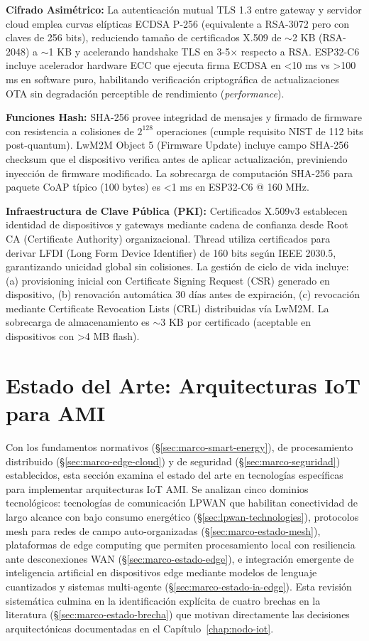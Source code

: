 \textbf{Cifrado Asimétrico:} La autenticación mutual TLS 1.3 entre gateway y servidor cloud emplea curvas elípticas ECDSA P-256 (equivalente a RSA-3072 pero con claves de 256 bits), reduciendo tamaño de certificados X.509 de $\sim$2 KB (RSA-2048) a $\sim$1 KB y acelerando handshake TLS en 3-5$\times$ respecto a RSA. ESP32-C6 incluye acelerador hardware ECC que ejecuta firma ECDSA en <10 ms vs >100 ms en software puro, habilitando verificación criptográfica de actualizaciones OTA sin degradación perceptible de rendimiento (\textit{performance}).

\textbf{Funciones Hash:} SHA-256 provee integridad de mensajes y firmado de firmware con resistencia a colisiones de $2^{128}$ operaciones (cumple requisito NIST de 112 bits post-quantum). LwM2M Object 5 (Firmware Update) incluye campo SHA-256 checksum que el dispositivo verifica antes de aplicar actualización, previniendo inyección de firmware modificado. La sobrecarga de computación SHA-256 para paquete CoAP típico (100 bytes) es <1 ms en ESP32-C6 @ 160 MHz.

\textbf{Infraestructura de Clave Pública (PKI):} Certificados X.509v3 establecen identidad de dispositivos y gateways mediante cadena de confianza desde Root CA (Certificate Authority) organizacional. Thread utiliza certificados para derivar LFDI (Long Form Device Identifier) de 160 bits según IEEE 2030.5, garantizando unicidad global sin colisiones. La gestión de ciclo de vida incluye: (a) provisioning inicial con Certificate Signing Request (CSR) generado en dispositivo, (b) renovación automática 30 días antes de expiración, (c) revocación mediante Certificate Revocation Lists (CRL) distribuidas vía LwM2M. La sobrecarga de almacenamiento es $\sim$3 KB por certificado (aceptable en dispositivos con >4 MB flash).

\section{Estado del Arte: Arquitecturas IoT para AMI}
\label{sec:marco-estado-arte}

Con los fundamentos normativos (§\ref{sec:marco-smart-energy}), de procesamiento distribuido (§\ref{sec:marco-edge-cloud}) y de seguridad (§\ref{sec:marco-seguridad}) establecidos, esta sección examina el estado del arte en tecnologías específicas para implementar arquitecturas IoT AMI. Se analizan cinco dominios tecnológicos: tecnologías de comunicación LPWAN que habilitan conectividad de largo alcance con bajo consumo energético (§\ref{sec:lpwan-technologies}), protocolos mesh para redes de campo auto-organizadas (§\ref{sec:marco-estado-mesh}), plataformas de edge computing que permiten procesamiento local con resiliencia ante desconexiones WAN (§\ref{sec:marco-estado-edge}), e integración emergente de inteligencia artificial en dispositivos edge mediante modelos de lenguaje cuantizados y sistemas multi-agente (§\ref{sec:marco-estado-ia-edge}). Esta revisión sistemática culmina en la identificación explícita de cuatro brechas en la literatura (§\ref{sec:marco-estado-brecha}) que motivan directamente las decisiones arquitectónicas documentadas en el Capítulo~\ref{chap:nodo-iot}.

